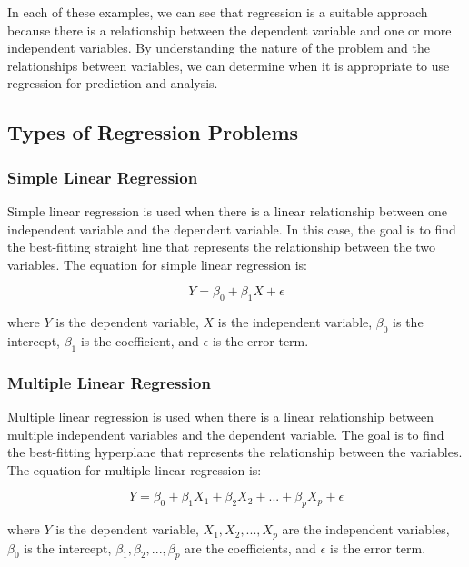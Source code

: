 \documentclass{article}
\begin{document}
In each of these examples, we can see that regression is a suitable approach because there is a relationship between the dependent variable and one or more independent variables. By understanding the nature of the problem and the relationships between variables, we can determine when it is appropriate to use regression for prediction and analysis.

\subsection{Types of Regression Problems}

\subsubsection{Simple Linear Regression}

Simple linear regression is used when there is a linear relationship between one independent variable and the dependent variable. In this case, the goal is to find the best-fitting straight line that represents the relationship between the two variables. The equation for simple linear regression is:

\begin{equation}
Y = \beta_0 + \beta_1X + \epsilon
\end{equation}

where $Y$ is the dependent variable, $X$ is the independent variable, $\beta_0$ is the intercept, $\beta_1$ is the coefficient, and $\epsilon$ is the error term.

\subsubsection{Multiple Linear Regression}

Multiple linear regression is used when there is a linear relationship between multiple independent variables and the dependent variable. The goal is to find the best-fitting hyperplane that represents the relationship between the variables. The equation for multiple linear regression is:

\begin{equation}
Y = \beta_0 + \beta_1X_1 + \beta_2X_2 + ... + \beta_pX_p + \epsilon
\end{equation}

where $Y$ is the dependent variable, $X_1, X_2, ..., X_p$ are the independent variables, $\beta_0$ is the intercept, $\beta_1, \beta_2, ..., \beta_p$ are the coefficients, and $\epsilon$ is the error term.
\end{document}
